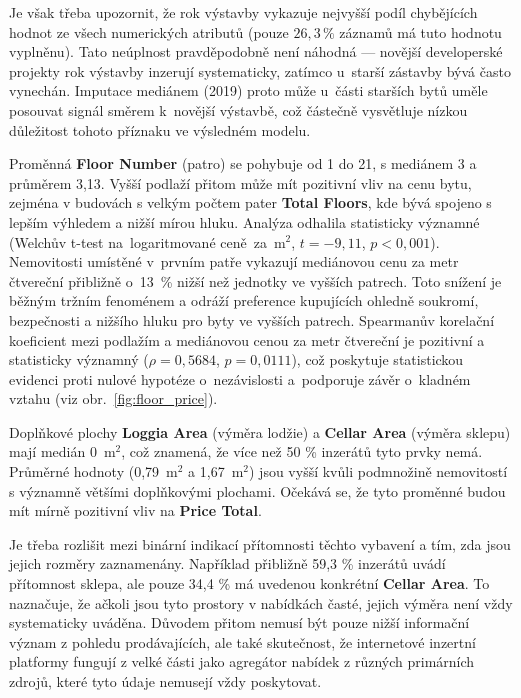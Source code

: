 Je však třeba upozornit, že rok výstavby vykazuje nejvyšší podíl chybějících hodnot ze všech numerických atributů (pouze $26{,}3\,\%$ záznamů má tuto hodnotu vyplněnu). Tato neúplnost pravděpodobně není náhodná --- novější developerské projekty rok výstavby inzerují systematicky, zatímco u~starší zástavby bývá často vynechán. Imputace mediánem (2019) proto může u~části starších bytů uměle posouvat signál směrem k~novější výstavbě, což částečně vysvětluje nízkou důležitost tohoto příznaku ve výsledném modelu.

Proměnná \textbf{Floor Number} (patro) se pohybuje od 1 do 21, s mediánem 3 a průměrem 3,13. Vyšší podlaží přitom může mít pozitivní vliv na cenu bytu, zejména v budovách s velkým počtem pater \textbf{Total Floors}, kde bývá spojeno s lepším výhledem a nižší mírou hluku.
Analýza odhalila statisticky významné  (Welchův t-test na~logaritmované ceně~za~$\mathrm{m}^2$, $t = -9{,}11$, $p < 0{,}001$). Nemovitosti umístěné v~prvním patře vykazují mediánovou cenu za metr čtvereční přibližně o~13~\% nižší než jednotky ve vyšších patrech. Toto snížení je běžným tržním fenoménem a odráží preference kupujících ohledně soukromí, bezpečnosti a nižšího hluku pro byty ve vyšších patrech. 
Spearmanův korelační koeficient mezi podlažím a mediánovou cenou za metr čtvereční je pozitivní a statisticky významný ($\rho = 0{,}5684$, $p = 0{,}0111$), což poskytuje statistickou evidenci proti nulové hypotéze o~nezávislosti a~podporuje závěr o~kladném vztahu (viz obr.~\ref{fig:floor_price}).

Doplňkové plochy \textbf{Loggia Area} (výměra lodžie) a \textbf{Cellar Area} (výměra sklepu) mají medián 0~$\mathrm{m}^2$, což znamená, že více než 50 \% inzerátů tyto prvky nemá. Průměrné hodnoty (0{,}79~$\mathrm{m}^2$ a 1{,}67~$\mathrm{m}^2$) jsou vyšší kvůli podmnožině nemovitostí s významně většími doplňkovými plochami. Očekává se, že tyto proměnné budou mít mírně pozitivní vliv na \textbf{Price Total}.

Je třeba rozlišit mezi binární indikací přítomnosti těchto vybavení a tím, zda jsou jejich rozměry zaznamenány. Například přibližně 59{,}3 \% inzerátů uvádí přítomnost sklepa, ale pouze 34{,}4 \% má uvedenou konkrétní \textbf{Cellar Area}. To naznačuje, že ačkoli jsou tyto prostory v nabídkách časté, jejich výměra není vždy systematicky uváděna. Důvodem přitom nemusí být pouze nižší informační význam z pohledu prodávajících, ale také skutečnost, že internetové inzertní platformy fungují z velké části jako agregátor nabídek z různých primárních zdrojů, které tyto údaje nemusejí vždy poskytovat.

